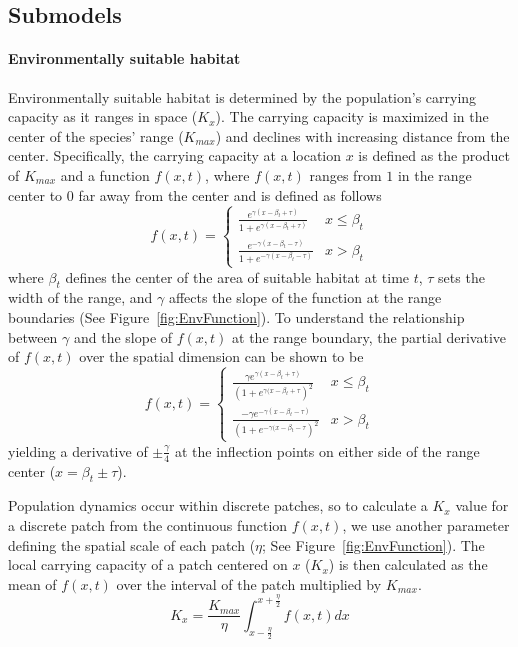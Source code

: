 \documentclass[12pt, oneside]{article}
\begin{document}
\subsection*{Submodels}
\paragraph{Environmentally suitable habitat}
Environmentally suitable habitat is determined by the population's carrying capacity as it ranges in space ($K_{x}$). The carrying capacity is maximized in the center of the species' range ($K_{max}$) and declines with increasing distance from the center. Specifically, the carrying capacity at a location $x$ is defined as the product of $K_{max}$ and a function $f(x,t)$, where $f(x,t)$ ranges from $1$ in the range center to $0$ far away from the center and is defined as follows 
\begin{equation}
f(x,t)=
\begin{cases}
	\frac{e^{\gamma(x-\beta_{t}+\tau)}}{1+e^{\gamma(x-\beta_{t}+\tau)}} & x \leq \beta_{t} \\
	\frac{e^{-\gamma(x-\beta_{t}-\tau)}}{1+e^{-\gamma(x-\beta_{t}-\tau)}} & x > \beta_{t}
\end{cases}
\end{equation}
where $\beta_{t}$ defines the center of the area of suitable habitat at time $t$, $\tau$ sets the width of the range, and $\gamma$ affects the slope of the function at the range boundaries (See Figure~\ref{fig:EnvFunction}). To understand the relationship between $\gamma$ and the slope of $f(x,t)$ at the range boundary, the partial derivative of $f(x,t)$ over the spatial dimension can be shown to be
\begin{equation}
f(x,t)=
\begin{cases}
	\frac{\gamma e^{\gamma(x-\beta_{t}+\tau)}}{(1+e^{\gamma(x-\beta_{t}+\tau})^{2}} & x \leq \beta_{t} \\
	\frac{-\gamma e^{-\gamma(x-\beta_{t}-\tau)}}{(1+e^{-\gamma(x-\beta_{t}-\tau})^{2}} & x > \beta_{t}
\end{cases}	
\end{equation}
yielding a derivative of $\pm\frac{\gamma}{4}$ at the inflection points on either side of the range center ($x=\beta_{t}\pm\tau$).

Population dynamics occur within discrete patches, so to calculate a $K_{x}$ value for a discrete patch from the continuous function $f(x,t)$, we use another parameter defining the spatial scale of each patch ($\eta$; See Figure~\ref{fig:EnvFunction}). The local carrying capacity of a patch centered on $x$ ($K_{x}$) is then calculated as the mean of $f(x,t)$ over the interval of the patch multiplied by $K_{max}$.
\begin{equation}
K_{x} = \frac{K_{max}}{\eta}\int_{x-\frac{\eta}{2}}^{x+\frac{\eta}{2}}f(x,t)dx
\end{equation}
\end{document}
